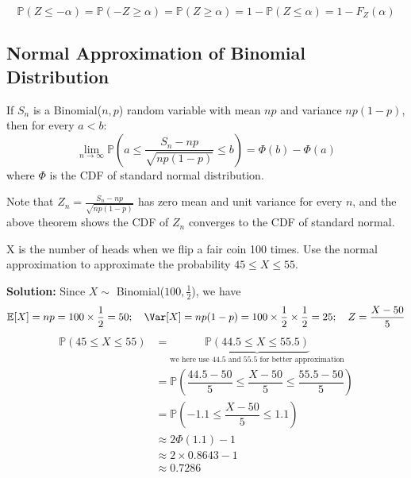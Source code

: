 \begin{remark}
    \[
    \mathbb{P}(Z \leq -\alpha) = \mathbb{P}(-Z \geq \alpha) = \mathbb{P}(Z \geq \alpha) = 1 - \mathbb{P}(Z \leq \alpha) = 1 - F_Z(\alpha)
\]
\end{remark}

\subsection{Normal Approximation of Binomial Distribution}
\begin{theorem}
    If \(S_n\) is a Binomial(\(n, p\)) random variable with mean \(np\) and variance \(np(1 - p)\), then for every \(a < b\): 
    \[
        \lim_{n \to \infty} \mathbb{P}\left(a \leq  \dfrac{S_n - np}{\sqrt{np(1 - p)}} \leq  b\right) = \varPhi (b) - \varPhi (a)
    \]
    where \(\varPhi\) is the CDF of standard normal distribution. 
    \begin{remark}
        Note that \(Z_n = \frac{S_n - np}{\sqrt{np(1 - p)}}\) has zero mean and unit variance for every \(n\), and the above theorem shows the CDF of \(Z_n\) converges to the CDF of standard normal. 
    \end{remark}
\end{theorem}

\begin{eg}
    X is the number of heads when we flip a fair coin 100 times. Use the normal approximation to approximate the probability \(45 \leq X \leq 55\). 

    \textbf{Solution:} 
    Since \(X \sim\) Binomial(\(100, \frac{1}{2}\)), we have 
    \[
        \mathbb{E}[X] = np = 100 \times \dfrac{1}{2} = 50;\quad \Var[X] = np(1 - p) = 100 \times \dfrac{1}{2} \times \dfrac{1}{2} = 25;\quad Z = \dfrac{X - 50}{5}
    \]
    \[
    \begin{aligned}
        \mathbb{P}(45 \leq X \leq 55) &= \underbrace{\mathbb{P}(44.5 \leq X \leq 55.5)}_{\text{we here use 44.5 and 55.5 for better approximation}} \\
        &= \mathbb{P}(\dfrac{44.5 - 50}{5} \leq \dfrac{X - 50}{5} \leq \dfrac{55.5 - 50}{5}) \\
         &= \mathbb{P}(-1.1 \leq \dfrac{X - 50}{5} \leq 1.1) \\
         &\approx 2\varPhi (1.1) - 1 \\
         &\approx 2 \times 0.8643 - 1 \\
         &\approx 0.7286 \\
    \end{aligned}
    \]
\end{eg}

